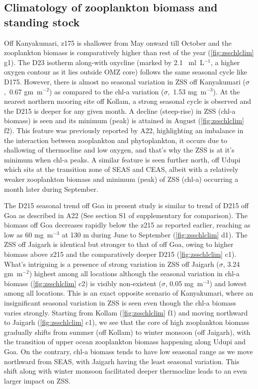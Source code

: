 \documentclass{article}
\begin{document}
	\subsection{Climatology of zooplankton biomass and standing stock}
	\label{sec:climatology}
	Off Kanyakumari, z175 is shallower from May onward till October and the zooplankton biomass is comparatively higher than rest of the year (\cref{fig:zsschlclim} g1). The D23 isotherm along-with oxycline (marked by 2.1 ~ml~L$^{-1}$, a higher oxygen contour as it lies outside OMZ core) follows the same seasonal cycle like D175. However, there is almost no seasonal variation in ZSS off Kanyakumari ($\sigma$,~0.67 gm~m$^{-2}$) as compared to the chl-a variation ($\sigma$,~1.53 mg~m$^{-3}$). At the nearest northern mooring site off Kollam, a strong seasonal cycle is observed and the D215 is deeper for any given month. A decline (steep-rise) in ZSS (chl-a  biomass) is seen and its minimum (peak) is attained in August (\cref{fig:zsschlclim} f2). This feature was previously reported by A22, highlighting an imbalance in the interaction between zooplankton and phytoplankton, it occurs due to shallowing of thermocline and low oxygen, and that's why the ZSS is at it's minimum when chl-a peaks. A similar feature is seen further north, off Udupi which sits at the transition zone of SEAS and CEAS, albeit with a relatively weaker zooplankton biomass and minimum (peak) of ZSS (chl-a) occurring a month later during September.
	
	The D215 seasonal trend off Goa in present study is similar to trend of D215 off Goa as described in A22 (See section S1 of supplementary for comparison). The biomass off Goa decreases rapidly below the z215 as reported earlier, reaching as low as 60 mg~m$^{-3}$ at 130 m during June to September (\cref{fig:zsschlclim} d1). The ZSS off Jaigarh is identical but stronger to that of off Goa, owing to higher biomass above z215 and the comparatively deeper D215 (\cref{fig:zsschlclim} c1). What's intriguing is a presence of strong variation in ZSS off Jaigarh ($\sigma$, 3.24 gm~m$^{-2}$) highest among all locations although the seasonal variation in chl-a biomass (\cref{fig:zsschlclim} c2) is visibly non-existent ($\sigma$, 0.05 mg~m$^{-3}$) and lowest among all locations. This is an exact opposite scenario of Kanyakumari, where an insignificant seasonal variation in ZSS is seen even though the chl-a biomass varies strongly. Starting from Kollam (\cref{fig:zsschlclim} f1) and moving northward to Jaigarh (\cref{fig:zsschlclim} c1), we see that the core of high zooplankton biomass gradually shifts from summer (off Kollam) to winter monsoon (off Jaigarh), with the transition of upper ocean zooplankton biomass happening along Udupi and Goa. On the contrary, chl-a biomass tends to have low seasonal range as we move northward from SEAS, with Jaigarh having the least seasonal variation. This shift along with winter monsoon facilitated deeper thermocline leads to an even larger impact on ZSS.
	
\end{document}
